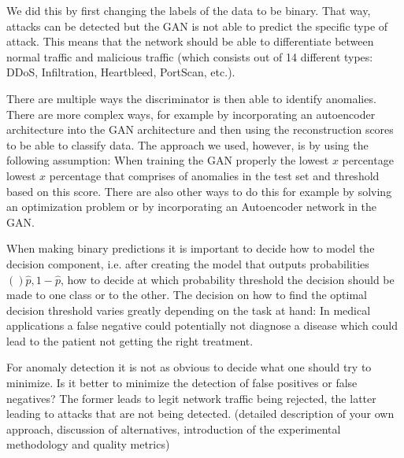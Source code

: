 \documentclass[]{article}
\begin{document}
	 
	 We did this by first changing the labels of the data to be binary. That way, attacks can be detected but the GAN is not able to predict the specific type of attack. This means that the network should be able to differentiate between normal traffic and malicious traffic (which consists out of 14 different types: DDoS, Infiltration, Heartbleed, PortScan, etc.).
	 
	 
     There are multiple ways the discriminator is then able to identify anomalies. There are more complex ways, for example by incorporating an autoencoder architecture into the GAN architecture and then using the reconstruction scores to be able to classify data. The approach we used, however, is by using the following assumption: When training the GAN properly the lowest $x$ percentage lowest $x$ percentage that comprises of anomalies in the test set and threshold based on this score. There are also other ways to do this for example by solving an optimization problem or by incorporating an Autoencoder network in the GAN.
     
     When making binary predictions it is important to decide how to model the decision component, i.e. after creating the model that outputs probabilities $()\hat{p}, 1-\hat{p}$, how to decide at which probability threshold the decision should be made to one class or to the other. The decision on how to find the optimal decision threshold varies greatly depending on the task at hand: In medical applications a false negative could potentially not diagnose a disease which could lead to the patient not getting the right treatment.
     
     For anomaly detection it is not as obvious to decide what one should try to minimize. Is it better to minimize the detection of false positives or false negatives? The former leads to legit network traffic being rejected, the latter leading to attacks that are not being detected. 
	(detailed description of your own approach, discussion of alternatives, introduction of the experimental methodology and quality metrics)
\end{document}
